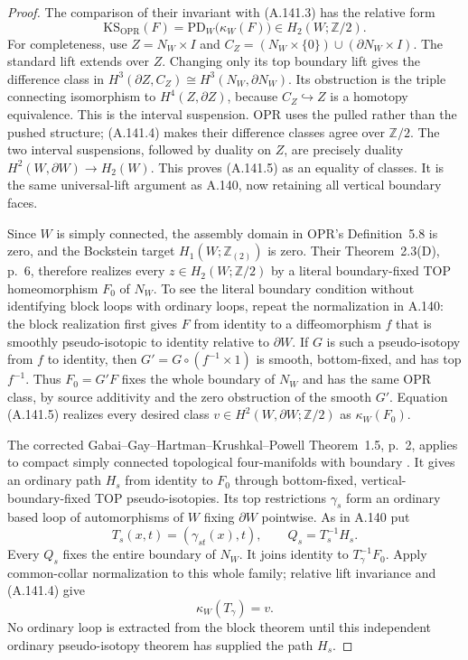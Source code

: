 \begin{proof}
The comparison of their invariant with (A.141.3) has the relative
form
\[
       \mathrm{KS}_{\mathrm{OPR}}(F)
          =\mathrm{PD}_W\bigl(\kappa_W(F)\bigr)
                   \in H_2(W;\mathbb Z/2).           \tag{A.141.5}
\]
For completeness, use $Z=N_W\times I$ and
$C_Z=(N_W\times\{0\})\cup(\partial N_W\times I)$.
The standard lift extends over $Z$. Changing only its top
boundary lift gives the difference class in
$H^3(\partial Z,C_Z)\cong H^3(N_W,\partial N_W)$.
Its obstruction is the triple connecting isomorphism to
$H^4(Z,\partial Z)$, because $C_Z\hookrightarrow Z$
is a homotopy equivalence. This is the interval suspension.
OPR uses the pulled rather than the pushed structure;
(A.141.4) makes their difference classes agree over $\mathbb Z/2$.
The two interval suspensions, followed by duality on $Z$,
are precisely duality
$H^2(W,\partial W)\to H_2(W)$. This proves (A.141.5) as an
equality of classes. It is the same universal-lift argument
as A.140, now retaining all vertical boundary faces.

Since $W$ is simply connected, the assembly domain in
OPR's Definition~5.8 is zero, and the Bockstein target
$H_1(W;\mathbb Z_{(2)})$ is zero. Their Theorem~2.3(D),
p.~6, therefore realizes every $z\in H_2(W;\mathbb Z/2)$
by a literal boundary-fixed TOP homeomorphism $F_0$ of
$N_W$. To see the literal boundary condition without
identifying block loops with ordinary loops, repeat the
normalization in A.140: the block realization first gives
$F$ from identity to a diffeomorphism $f$ that is smoothly
pseudo-isotopic to identity relative to $\partial W$.
If $G$ is such a pseudo-isotopy from $f$ to identity, then
$G'=G\circ(f^{-1}\times1)$ is smooth, bottom-fixed,
and has top $f^{-1}$. Thus $F_0=G'F$ fixes the whole
boundary of $N_W$ and has the same OPR class, by source
additivity and the zero obstruction of the smooth $G'$.
Equation (A.141.5) realizes every desired class
$v\in H^2(W,\partial W;\mathbb Z/2)$ as $\kappa_W(F_0)$.

The corrected Gabai--Gay--Hartman--Krushkal--Powell
Theorem~1.5, p.~2, applies to compact simply connected
topological four-manifolds with boundary
\cite{GabaiGayHartmanKrushkalPowell2026}.
It gives an ordinary path $H_s$ from identity to $F_0$
through bottom-fixed, vertical-boundary-fixed TOP
pseudo-isotopies. Its top restrictions $\gamma_s$
form an ordinary based loop of automorphisms of $W$
fixing $\partial W$ pointwise. As in A.140 put
\[
 T_s(x,t)=(\gamma_{st}(x),t),\qquad Q_s=T_s^{-1}H_s.
\]
Every $Q_s$ fixes the entire boundary of $N_W$.
It joins identity to $T_\gamma^{-1}F_0$.
Apply common-collar normalization to this whole family;
relative lift invariance and (A.141.4) give
\[
                \kappa_W(T_\gamma)=v.                \tag{A.141.6}
\]
No ordinary loop is extracted from the block theorem
until this independent ordinary pseudo-isotopy theorem
has supplied the path $H_s$.


\end{proof}
